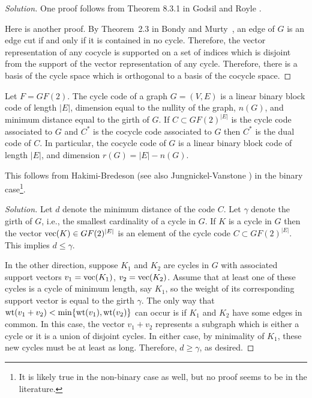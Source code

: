\begin{proof}[Solution]
One proof follows from Theorem 8.3.1 in Godsil and Royle \cite{GodsilRoyle2004}.

Here is another proof.
By Theorem~2.3 in Bondy and Murty~\cite[p.27]{BondyMurty1976},
an edge of $G$ is an edge cut if and only if it
is contained in no cycle.
Therefore, the vector representation of any 
cocycle is supported on a set of indices which is disjoint from the 
support of the vector representation of any
cycle. Therefore, there is a basis of the cycle space which is 
orthogonal to a basis of the cocycle space.
\end{proof}

\begin{proposition}
{\rm
Let $F=GF(2)$.
The cycle code of a graph $G=(V,E)$ is a linear binary block code of 
length $|E|$,  dimension equal to the nullity of the graph, $n(G)$,
and minimum distance equal to the girth of $G$.
If $C\subset GF(2)^{|E|}$ is the cycle code associated to $G$  
and $C^*$ is the cocycle code associated to $G$ then
$C^*$ is the dual code of $C$. In particular,
the cocycle code of $G$ is a linear binary block code of length
$|E|$, and dimension $r(G)=|E|-n(G)$.
}
\end{proposition}

This follows from Hakimi-Bredeson \cite{HakimiBredeson1968}
(see also Jungnickel-Vanstone \cite{JungnickelVanstone1997})
in the binary case\footnote{It is likely true
in the non-binary case as well, but no
proof seems to be in the literature.}. 

\begin{proof}[Solution]
Let $d$ denote the minimum distance of the code $C$.
Let $\gamma$ denote the girth of $G$,
i.e., the smallest cardinality of a cycle in $G$.
If $K$ is a cycle in $G$ then the
vector ${\rm vec}(K)\in GF(2)^{|E|}$ is an element of the
cycle code $C\subset GF(2)^{|E|}$. This implies $d\leq \gamma$.

In the other direction, suppose $K_1$ and $K_2$ are
cycles in $G$ with associated support vectors 
$v_1={\rm vec}(K_1)$, $v_2={\rm vec}(K_2)$.
Assume that at least one of these cycles is a cycle
of minimum length, say $K_1$, so the weight of its corresponding 
support vector is equal to the girth $\gamma$.
The only way that 
${\rm wt}(v_1+v_2)<\min\{{\rm wt}(v_1),{\rm wt}(v_2)\}$ 
can occur is if $K_1$ and $K_2$ have some
edges in common. In this case, the vector
$v_1+v_2$ represents a subgraph 
which is either a cycle or it is a 
union of disjoint cycles. In either case, by
minimality of $K_1$, these new cycles must be at least as
long. Therefore, $d\geq \gamma$, as desired.

\end{proof}

